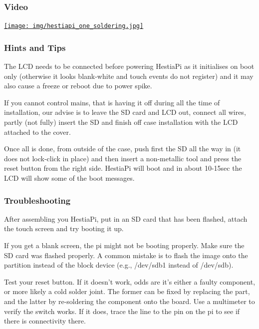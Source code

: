 \subsubsection{Video}
\href{https://www.youtube.com/watch?v=gRcRINqT31g}{\texttt{[image: img/hestiapi\_one\_soldering.jpg]}}

\subsubsection{Hints and Tips}
The LCD needs to be connected before powering HestiaPi as it initialises on
boot only (otherwise it looks blank-white and touch events do not register) and
it may also cause a freeze or reboot due to power spike.

If you cannot control mains, that is having it off during all the time of
installation, our advise is to leave the SD card and LCD out, connect all
wires, partly (not fully) insert the SD and finish off case installation with
the LCD attached to the cover.

Once all is done, from outside of the case, push first the SD all the way in
(it does not lock-click in place) and then insert a non-metallic tool and press
the reset button from the right side. HestiaPi will boot and in about 10-15sec
the LCD will show some of the boot messages.

\subsubsection{Troubleshooting}
After assembling you HestiaPi, put in an SD card that has been flashed, attach
the touch screen and try booting it up.

If you get a blank screen, the pi might not be booting properly.  Make sure the
SD card was flashed properly.  A common mistake is to flash the image onto the
partition instead of the block device (e.g., /dev/sdb1 instead of /dev/sdb).

Test your reset button.  If it doesn't work, odds are it's either a faulty
component, or more likely a cold solder joint.  The former can be fixed by
replacing the part, and the latter by re-soldering the component onto the
board.  Use a multimeter to verify the switch works.  If it does, trace the
line to the pin on the pi to see if there is connectivity there.
